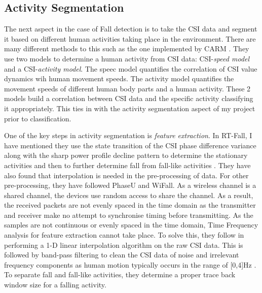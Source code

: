 \subsection{Activity Segmentation}
The next aspect in the case of Fall detection is to take the CSI data and segment it based on different human activities taking place in the environment. There are many different methods to this such as the one implemented by CARM \citep{CARM}. They use two models to determine a human activity from CSI data: CSI-\textit{speed model} and a CSI-\textit{activity model}. The speec model quantifies the correlation of CSI value dynamics wih human movement speeds. The activity model quantifies the movement speeds of different human body parts and a human activity. These 2 models build a correlation between CSI data and the specific activity classifying it appropriately. This ties in with the activity segmentation aspect of my project prior to classification. \par
One of the key steps in activity segmentation is \textit{feature extraction}. In RT-Fall, I have mentioned they use the state transition of the CSI phase difference variance along with the sharp power profile decline pattern to determine the stationary activities and then to further determine fall from fall-like activities \citep{RTFall}. They have also found that interpolation is needed in the pre-processing of data. For other pre-processing, they have followed PhaseU and WiFall. As a wireless channel is a shared channel, the devices use random access to share the channel. As a result, the received packets are not evenly spaced in the time domain as the transmitter and receiver make no attempt to synchronise timing before transmitting. As the samples are not continuous or evenly spaced in the time domain, Time Frequency analysis for feature extraction cannot take place. To solve this, they follow \cite{gestureCSI} in performing a 1-D linear interpolation algorithm on the raw CSI data. This is followed by band-pass filtering to clean the CSI data of noise and irrelevant frequency components as human motion typically occurs in the range of [0,4]Hz \citep{RTFall}. To separate fall and fall-like activities, they determine a proper trace back window size for a falling activity. 
